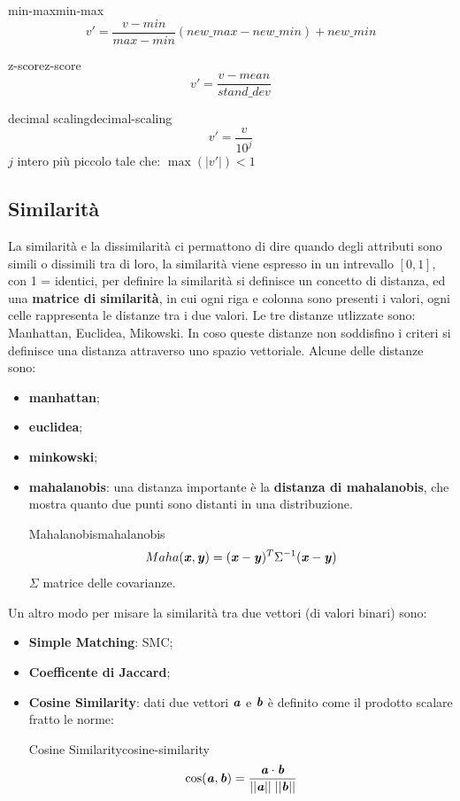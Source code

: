 \documentclass[12pt]{article}
\begin{document}
\begin{itemize}
\begin{itemize}
    \end{itemize}
        \begin{theorem}{min-max}{min-max}
            \[ v' = \frac{v - min}{max - min} (new\_max - new\_min) + new\_min \]
        \end{theorem}
        \begin{theorem}{z-score}{z-score}
            \[ v' = \frac{v - mean}{stand\_dev} \]
        \end{theorem}
        \begin{theorem}{decimal scaling}{decimal-scaling}
            \[ v' = \frac{v}{10^{j}} \]
            $j$ intero più piccolo tale che: $\max (|v'|) < 1$
        \end{theorem}
\end{itemize}

\subsection{Similarit\`a}
La similarit\`a e la dissimilarit\`a ci permattono di dire quando degli attributi sono simili o dissimili tra di loro, la similarit\`a viene espresso in un intrevallo $[0, 1]$, con 1 = identici, per definire la similarit\`a si definisce un concetto di distanza, ed una \textbf{matrice di similarit\`a}, in cui ogni riga e colonna sono presenti i valori, ogni celle rappresenta le distanze tra i due valori. Le tre distanze utlizzate sono: Manhattan, Euclidea, Mikowski. In coso queste distanze non soddisfino i criteri si definisce una distanza attraverso uno spazio vettoriale. Alcune delle distanze sono:
\begin{itemize}
    \item \textbf{manhattan};
    \item \textbf{euclidea};
    \item \textbf{minkowski};
    \item \textbf{mahalanobis}: una distanza importante \`e la \textbf{distanza di mahalanobis}, che mostra quanto due punti sono distanti in una distribuzione.
\begin{theorem}{Mahalanobis}{mahalanobis}
    \[ Maha(\textbf{\textit{x}}, \textbf{\textit{y}}) = (\textbf{\textit{x}} - \textbf{\textit{y}})^{T} \Sigma^{-1} (\textbf{\textit{x}} - \textbf{\textit{y}}) \]
    $\Sigma$ matrice delle covarianze.
\end{theorem}
\end{itemize}
Un altro modo per misare la similarit\`a tra due vettori (di valori binari) sono:
\begin{itemize}
    \item \textbf{Simple Matching}: SMC;
    \item \textbf{Coefficente di Jaccard};
    \item \textbf{Cosine Similarity}: dati due vettori $\textbf{\textit{a}}$ e $\textbf{\textit{b}}$ \`e definito come il prodotto scalare fratto le norme:
        \begin{theorem}{Cosine Similarity}{cosine-similarity}
            \[ \cos(\textbf{\textit{a}}, \textbf{\textit{b}}) = \frac{\textbf{\textit{a}} \cdot \textbf{\textit{b}}}{||\textbf{\textit{a}}|| \; ||\textbf{\textit{b}}||}  \]
        \end{theorem}
\end{itemize}
\end{document}
